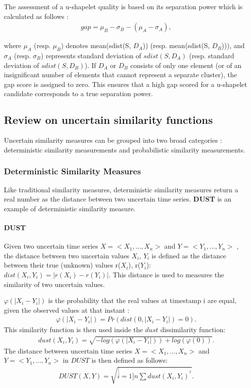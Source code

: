 The assessment of a u-shapelet quality is based on its separation power which is calculated as follows :
\begin{eqnarray}
gap=\mu_{B}-\sigma_{B}-(\mu_{A}-\sigma_{A}),
\end{eqnarray}


where $\mu_{A}$ (resp. $\mu_{B}$) denotes mean(sdist(S, $D_A$)) (resp. mean(sdist(S, $D_B$))), and
$\sigma_{A}$ (resp. $\sigma_{B}$) represents standard deviation of $sdist(S,
D_A)$ (resp. standard deviation of $sdist(S, D_B)$).
If $D_A$ or $D_B$ consists of only one element (or of an insignificant number of elements that cannot represent a separate cluster), the gap score is assigned to zero. This ensures that a  high gap scored for a u-shapelet candidate corresponds to a true separation power.   

\subsection{Review on uncertain similarity functions}


Uncertain similarity measures  can be grouped into two broad categories : deterministic similarity measurements and probabilistic similarity measurements.

\subsubsection{Deterministic Similarity Measures} 
Like traditional similarity measures, deterministic  similarity measures  return a real number as the distance between two uncertain time series. \textbf{DUST} is an example of deterministic similarity measure.
\paragraph{DUST}
\cite{murthy2013generalized} Given two uncertain time series $X=<X_1, \ldots,X_n>$ and $Y=<Y_1, \ldots,Y_n>$ , the distance between two uncertain values $X_i$, $Y_i$ is defined as the distance between their true (unknown) values r($X_i$), r($Y_i$): $dist(X_i, Y_i) = |r(X_i) - r(Y_i)|$. This distance is used to measures the similarity of two uncertain values. 

$\varphi(|X_{i}-Y_{i}|)$ is the probability that the real values at timestamp i are equal, given the observed values at that instant :
\begin{eqnarray}
\varphi(|X_{i}-Y_{i}|)=Pr(dist(0, |X_{i}-Y_{i}|)=0).
\end{eqnarray}
This similarity function is then used inside the $dust$ dissimilarity function:
\begin{eqnarray}
dust(X_{i},Y_{i})=\sqrt{-log(\varphi(|X_{i}-Y_{i}|))+log(\varphi(0))}.
\end{eqnarray}
The distance between uncertain time series $X=<X_1, \ldots,X_n>$ and $Y=<Y_1, \ldots,Y_n>$ in $DUST$
is then defined as follows:
\begin{eqnarray}
DUST(X,Y)=\sqrt{\stackrel[i=1]{n}{\sum}dust(X_{i},Y_{i})^{^{2}}}.
\end{eqnarray} 

